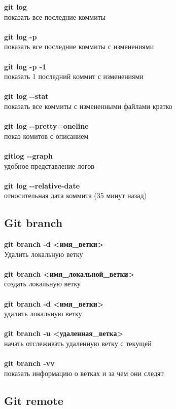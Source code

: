 \documentclass[a4paper, 12px]{article}
\begin{document}
\textbf{git log}\\показать все последние коммиты\\\\
\textbf{git log -p}\\показать все последние коммиты с изменениями\\\\
\textbf{git log -p -1}\\показать 1 последний коммит с изменениями\\\\
\textbf{git log -\--stat}\\показать все коммиты с измененными файлами кратко\\\\
\textbf{git log -\--pretty=oneline}\\показ комитов с описанием\\\\
\textbf{gitlog -\--graph}\\удобное представление логов\\\\
\textbf{git log -\--relative-date}\\относительная дата коммита (35 минут назад)

\subsection{Git branch}

\textbf{git branch -d <имя\_ветки>}\\Удалить локальную ветку\\\\
\textbf{git branch <имя\_локальной\_ветки>}\\создать локальную ветку\\\\
\textbf{git branch -d <имя\_ветки>}\\удалить локальную ветку\\\\
\textbf{git branch -u <удаленная\_ветка>}\\начать отслеживать удаленную ветку с текущей\\\\
\textbf{git branch -vv}\\показать информацию о ветках и за чем они следят

\subsection{Git remote}
\end{document}
